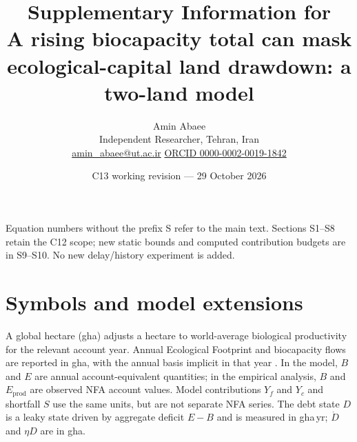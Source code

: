\documentclass[11pt,a4paper]{article}
\title{Supplementary Information for\\[4pt]
\large A rising biocapacity total can mask ecological-capital land drawdown: a two-land model}
\author{Amin Abaee\\ \small Independent Researcher, Tehran, Iran\\ \small \href{mailto:amin_abaee@ut.ac.ir}{amin\_abaee@ut.ac.ir} \quad\href{https://orcid.org/0000-0002-0019-1842}{ORCID 0000-0002-0019-1842}}
\date{C13 working revision --- 29 October 2026}
\begin{document}
\maketitle

\noindent Equation numbers without the prefix S refer to the main text. Sections S1--S8 retain the C12 scope; new static bounds and computed contribution budgets are in S9--S10. No new delay/history experiment is added.

\section{Symbols and model extensions}\label{si:symbols}

A global hectare (gha) adjusts a hectare to world-average biological productivity for the relevant account year. Annual Ecological Footprint and biocapacity flows are reported in gha, with the annual basis implicit in that year \citep{GFNStandards2009,GFNGuidebook2019}. In the model, $B$ and $E$ are annual account-equivalent quantities; in the empirical analysis, $B$ and $E_{\mathrm{prod}}$ are observed NFA account values. Model contributions $Y_f$ and $Y_c$ and shortfall $S$ use the same units, but are not separate NFA series. The debt state $D$ is a leaky state driven by aggregate deficit $E-B$ and is measured in gha\,yr; $\dot D$ and $\eta D$ are in gha.
\end{document}
